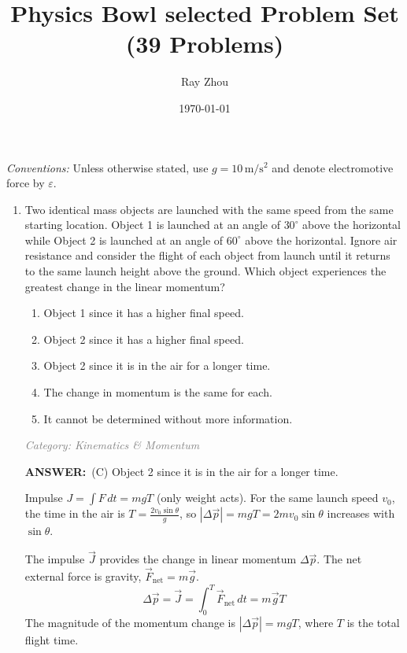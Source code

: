 ﻿\documentclass[12pt, a4paper]{article}
\title{Physics Bowl selected Problem Set (39 Problems)}
\author{Ray Zhou}
\date{\today}
\makeatletter
\newcommand{\finalanswer}[1]{\textbf{ANSWER:}~#1}
\newif\if@categoryprinted
\newcommand{\category}[1]{\if@categoryprinted\relax\else\textit{\textcolor{gray}{Category: #1}}\global\@categoryprintedtrue\fi}
\makeatother
\begin{document}
\begin{CJK*}{UTF8}{gbsn}

\maketitle

\noindent\textit{Conventions:} Unless otherwise stated, use \(g=10\,\mathrm{m/s^2}\) and denote electromotive force by \(\varepsilon\).\par\smallskip
\newpage

\begin{enumerate}[itemsep=1.0em, topsep=0.6em]

\item \label{prob:1}
Two identical mass objects are launched with the same speed from the same starting location. Object 1 is launched at an angle of $30^\circ$ above the horizontal while Object 2 is launched at an angle of $60^\circ$ above the horizontal. Ignore air resistance and consider the flight of each object from launch until it returns to the same launch height above the ground. Which object experiences the greatest change in the linear momentum?
\begin{enumerate}[label=(\Alph*)]
    \item Object 1 since it has a higher final speed.
    \item Object 2 since it has a higher final speed.
    \item Object 2 since it is in the air for a longer time.
    \item The change in momentum is the same for each.
    \item It cannot be determined without more information.
\end{enumerate}

\category{Kinematics \& Momentum}
\begin{answerbox}
\finalanswer{(C) Object 2 since it is in the air for a longer time.}
\end{answerbox}
\begin{insightbox}
Impulse $J=\int F\,dt=mgT$ (only weight acts). For the same launch speed $v_0$, the time in the air is $T=\tfrac{2v_0\sin\theta}{g}$, so $|\Delta\vec p|=mgT=2mv_0\sin\theta$ increases with $\sin\theta$.
\end{insightbox}
\begin{solutionbox}
The impulse $\vec{J}$ provides the change in linear momentum $\Delta \vec{p}$. The net external force is gravity, $\vec{F}_{\text{net}} = m\vec{g}$.
\[
\Delta \vec{p} = \vec{J} = \int_{0}^{T} \vec{F}_{\text{net}} \, dt = m\vec{g}T
\]
The magnitude of the momentum change is $|\Delta \vec{p}| = mgT$, where $T$ is the total flight time.


\end{solutionbox}
\end{enumerate}
\end{CJK*}
\end{document}
